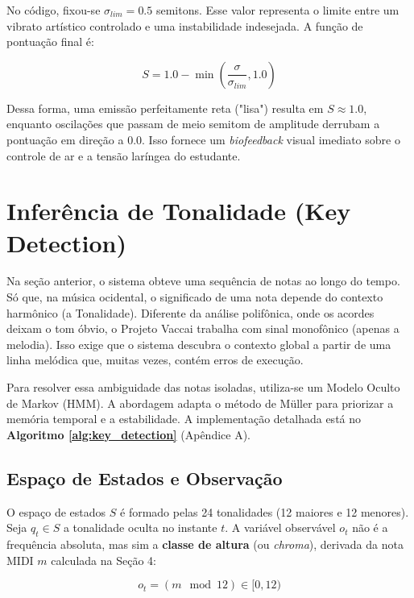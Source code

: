 \documentclass[11pt, a4paper]{article}
\theoremstyle{plain}
\theoremstyle{definition}
\begin{document}
No código, fixou-se $\sigma_{lim} = 0.5$ semitons. Esse valor representa o limite entre um vibrato artístico controlado e uma instabilidade indesejada. A função de pontuação final é:

\begin{equation}
    S = 1.0 - \min\left( \frac{\sigma}{\sigma_{lim}}, 1.0 \right)
\end{equation}

Dessa forma, uma emissão perfeitamente reta ("lisa") resulta em $S \approx 1.0$, enquanto oscilações que passam de meio semitom de amplitude derrubam a pontuação em direção a $0.0$. Isso fornece um \textit{biofeedback} visual imediato sobre o controle de ar e a tensão laríngea do estudante.

\section{Inferência de Tonalidade (Key Detection)}

Na seção anterior, o sistema obteve uma sequência de notas ao longo do tempo. Só que, na música ocidental, o significado de uma nota depende do contexto harmônico (a Tonalidade). Diferente da análise polifônica, onde os acordes deixam o tom óbvio, o Projeto Vaccai trabalha com sinal monofônico (apenas a melodia). Isso exige que o sistema descubra o contexto global a partir de uma linha melódica que, muitas vezes, contém erros de execução.

Para resolver essa ambiguidade das notas isoladas, utiliza-se um Modelo Oculto de Markov (HMM). A abordagem adapta o método de Müller \cite{muller_chap5} para priorizar a memória temporal e a estabilidade. A implementação detalhada está no \textbf{Algoritmo \ref{alg:key_detection}} (Apêndice A).

\subsection{Espaço de Estados e Observação}

O espaço de estados $S$ é formado pelas 24 tonalidades (12 maiores e 12 menores). Seja $q_t \in S$ a tonalidade oculta no instante $t$.
A variável observável $o_t$ não é a frequência absoluta, mas sim a \textbf{classe de altura} (ou \textit{chroma}), derivada da nota MIDI $m$ calculada na Seção 4:

\begin{equation}
    o_t = (m \mod 12) \in [0, 12)
\end{equation}
\end{document}
